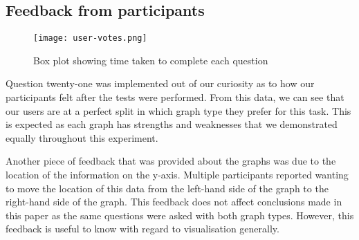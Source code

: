 \subsection*{Feedback from participants}
\begin{figure}[H]
    \centering
    \texttt{[image: user-votes.png]}
    \caption{Box plot showing time taken to complete each question}
\end{figure}
\begin{flushleft}
    \quad Question twenty-one was implemented out of our curiosity as to how our participants felt after the tests were performed.
    From this data, we can see that our users are at a perfect split in which graph type they prefer for this task. This is expected as 
    each graph has strengths and weaknesses that we demonstrated equally throughout this experiment.
    
    Another piece of feedback that was provided about the graphs was due to the location of the information on the y-axis. Multiple participants
    reported wanting to move the location of this data from the left-hand side of the graph to the right-hand side of the graph. This feedback does not affect
    conclusions made in this paper as the same questions were asked with both graph types. However, this feedback is useful to know with regard to visualisation
    generally.
\end{flushleft}


